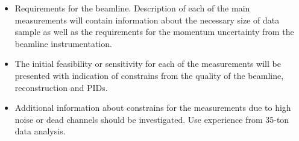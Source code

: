 \begin{itemize}
\item Requirements for the beamline. Description of  each of the main measurements will contain  information about the necessary size of data sample as well as the requirements  for the momentum uncertainty from the beamline instrumentation. 
\item The initial feasibility or sensitivity  for each of the measurements will be presented with indication of constrains from the quality of the beamline, reconstruction and PIDs. 
\item Additional information about constrains for the measurements due to high noise or dead channels should be investigated. Use experience from 35-ton data analysis. 
\end{itemize}

